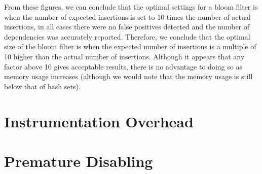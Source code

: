 From these figures, we can conclude that the optimal settings for a bloom filter is when the number of expected insertions is set to 10 times the number of actual insertions, in all cases there were no false positives detected and the number of dependencies was accurately reported. Therefore, we conclude that the optimal size of the bloom filter is when the expected number of insertions is a multiple of 10 higher than the actual number of insertions. Although it appears that any factor above 10 gives acceptable results, there is no advantage to doing so as memory usage increases (although we would note that the memory usage is still below that of hash sets).

\section{Instrumentation Overhead} \label{sec:results/overhead}

\section{Premature Disabling} \label{sec:results/disable}